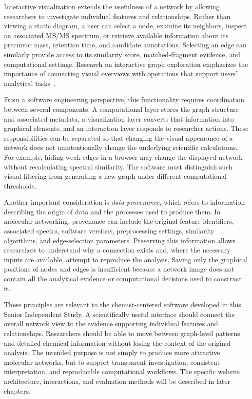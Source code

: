         Interactive visualization extends the usefulness of a network by allowing researchers to investigate individual features and relationships. Rather than viewing a static diagram, a user can select a node, examine its neighbors, inspect an associated MS/MS spectrum, or retrieve available information about its precursor mass, retention time, and candidate annotations. Selecting an edge can similarly provide access to its similarity score, matched-fragment evidence, and computational settings. Research on interactive graph exploration emphasizes the importance of connecting visual overviews with operations that support users' analytical tasks~\cite{Pienta2015}.

        From a software engineering perspective, this functionality requires coordination between several components. A computational layer stores the graph structure and associated metadata, a visualization layer converts that information into graphical elements, and an interaction layer responds to researcher actions. These responsibilities can be separated so that changing the visual appearance of a network does not unintentionally change the underlying scientific calculations. For example, hiding weak edges in a browser may change the displayed network without recalculating spectral similarity. The software must distinguish such visual filtering from generating a new graph under different computational thresholds.

        Another important consideration is \emph{data provenance}, which refers to information describing the origin of data and the processes used to produce them. In molecular networking, provenance can include the original feature identifiers, associated spectra, software versions, preprocessing settings, similarity algorithms, and edge-selection parameters. Preserving this information allows researchers to understand why a connection exists and, where the necessary inputs are available, attempt to reproduce the analysis. Saving only the graphical positions of nodes and edges is insufficient because a network image does not contain all the analytical evidence or computational decisions used to construct it.

        These principles are relevant to the chemist-centered software developed in this Senior Independent Study. A scientifically useful interface should connect the overall network view to the evidence supporting individual features and relationships. Researchers should be able to move between graph-level patterns and detailed chemical information without losing the context of the original analysis. The intended purpose is not simply to produce more attractive molecular networks, but to support transparent investigation, consistent interpretation, and reproducible computational workflows. The specific website architecture, interactions, and evaluation methods will be described in later chapters.

